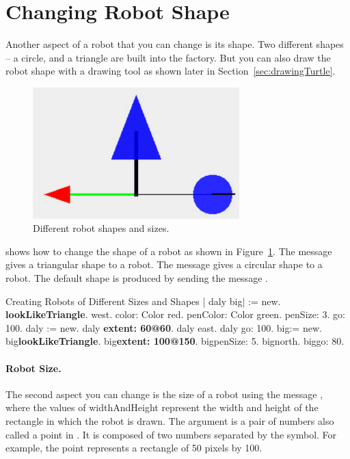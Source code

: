 \section{Changing Robot Shape}
Another aspect of a robot that you can change is its shape. Two different shapes -- a circle, and a triangle  are built into the  factory. But you can also draw the robot shape with a drawing tool as shown later in Section~\ref{sec:drawingTurtle}.

\begin{figure}[h]
\begin{center}
\includegraphics[width=8cm]{shapeAndSize}
\caption{Different robot shapes and sizes. \label{fig:shapeAndSize}}
\end{center}
\end{figure}

 shows how to change the shape of a robot as shown in Figure~\ref{fig:shapeAndSize}. The message   gives a triangular shape to a robot. The message  gives a circular shape to a robot. The default shape is produced by sending the message   . 

\begin{scriptwithtitle}{Creating Robots of Different Sizes and Shapes}\label{scr:differentsize}
| \caro daly  big\caro |
\caro := \Turtle new.
\caro \textbf{lookLikeTriangle}.
\caro west.
\caro color: Color red.
\caro penColor: Color green.
\caro penSize: 3.
\caro go: 100.
daly := \Turtle new.
daly \textbf{extent: 60@60}.
daly east.
daly go: 100.
big\caro := \Turtle new.
big\caro \textbf{lookLikeTriangle}.
big\caro \textbf{extent: 100@150}.
big\caro penSize: 5.
big\caro north.
big\caro go: 80.
\end{scriptwithtitle}


\paragraph{Robot Size.} The second aspect you can change is the size of a robot using the message  , where the values of widthAndHeight represent the width and height of the rectangle in which the robot is drawn.  The argument  is a pair of numbers also called a point in \sq. It is composed of two numbers separated by the  symbol. For example, the point  represents a rectangle of 50 pixels by 100.







